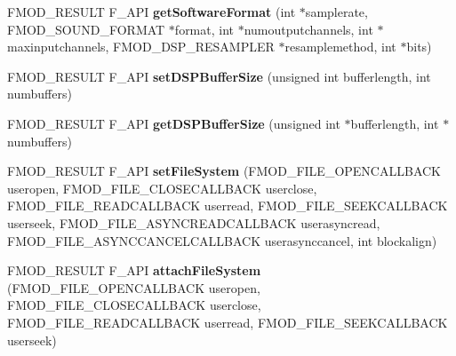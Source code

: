 \begin{DoxyCompactItemize}
\item 
F\+M\+O\+D\+\_\+\+R\+E\+S\+U\+LT F\+\_\+\+A\+PI {\bfseries get\+Software\+Format} (int $\ast$samplerate, F\+M\+O\+D\+\_\+\+S\+O\+U\+N\+D\+\_\+\+F\+O\+R\+M\+AT $\ast$format, int $\ast$numoutputchannels, int $\ast$maxinputchannels, F\+M\+O\+D\+\_\+\+D\+S\+P\+\_\+\+R\+E\+S\+A\+M\+P\+L\+ER $\ast$resamplemethod, int $\ast$bits)\hypertarget{class_f_m_o_d_1_1_system_aec52071eb8a2ed416e70b393f701add4}{}\label{class_f_m_o_d_1_1_system_aec52071eb8a2ed416e70b393f701add4}

\item 
F\+M\+O\+D\+\_\+\+R\+E\+S\+U\+LT F\+\_\+\+A\+PI {\bfseries set\+D\+S\+P\+Buffer\+Size} (unsigned int bufferlength, int numbuffers)\hypertarget{class_f_m_o_d_1_1_system_af715ce88b8dd4b9653a09ba8ea7e7cfd}{}\label{class_f_m_o_d_1_1_system_af715ce88b8dd4b9653a09ba8ea7e7cfd}

\item 
F\+M\+O\+D\+\_\+\+R\+E\+S\+U\+LT F\+\_\+\+A\+PI {\bfseries get\+D\+S\+P\+Buffer\+Size} (unsigned int $\ast$bufferlength, int $\ast$numbuffers)\hypertarget{class_f_m_o_d_1_1_system_a2aa3e1c3193075a3dac5fd35361f8df5}{}\label{class_f_m_o_d_1_1_system_a2aa3e1c3193075a3dac5fd35361f8df5}

\item 
F\+M\+O\+D\+\_\+\+R\+E\+S\+U\+LT F\+\_\+\+A\+PI {\bfseries set\+File\+System} (F\+M\+O\+D\+\_\+\+F\+I\+L\+E\+\_\+\+O\+P\+E\+N\+C\+A\+L\+L\+B\+A\+CK useropen, F\+M\+O\+D\+\_\+\+F\+I\+L\+E\+\_\+\+C\+L\+O\+S\+E\+C\+A\+L\+L\+B\+A\+CK userclose, F\+M\+O\+D\+\_\+\+F\+I\+L\+E\+\_\+\+R\+E\+A\+D\+C\+A\+L\+L\+B\+A\+CK userread, F\+M\+O\+D\+\_\+\+F\+I\+L\+E\+\_\+\+S\+E\+E\+K\+C\+A\+L\+L\+B\+A\+CK userseek, F\+M\+O\+D\+\_\+\+F\+I\+L\+E\+\_\+\+A\+S\+Y\+N\+C\+R\+E\+A\+D\+C\+A\+L\+L\+B\+A\+CK userasyncread, F\+M\+O\+D\+\_\+\+F\+I\+L\+E\+\_\+\+A\+S\+Y\+N\+C\+C\+A\+N\+C\+E\+L\+C\+A\+L\+L\+B\+A\+CK userasynccancel, int blockalign)\hypertarget{class_f_m_o_d_1_1_system_a5dc43bac9fbd400109dc17464f07c5eb}{}\label{class_f_m_o_d_1_1_system_a5dc43bac9fbd400109dc17464f07c5eb}

\item 
F\+M\+O\+D\+\_\+\+R\+E\+S\+U\+LT F\+\_\+\+A\+PI {\bfseries attach\+File\+System} (F\+M\+O\+D\+\_\+\+F\+I\+L\+E\+\_\+\+O\+P\+E\+N\+C\+A\+L\+L\+B\+A\+CK useropen, F\+M\+O\+D\+\_\+\+F\+I\+L\+E\+\_\+\+C\+L\+O\+S\+E\+C\+A\+L\+L\+B\+A\+CK userclose, F\+M\+O\+D\+\_\+\+F\+I\+L\+E\+\_\+\+R\+E\+A\+D\+C\+A\+L\+L\+B\+A\+CK userread, F\+M\+O\+D\+\_\+\+F\+I\+L\+E\+\_\+\+S\+E\+E\+K\+C\+A\+L\+L\+B\+A\+CK userseek)\hypertarget{class_f_m_o_d_1_1_system_ab4314f764055fc5eae09febb194774ca}{}\label{class_f_m_o_d_1_1_system_ab4314f764055fc5eae09febb194774ca}


\end{DoxyCompactItemize}

